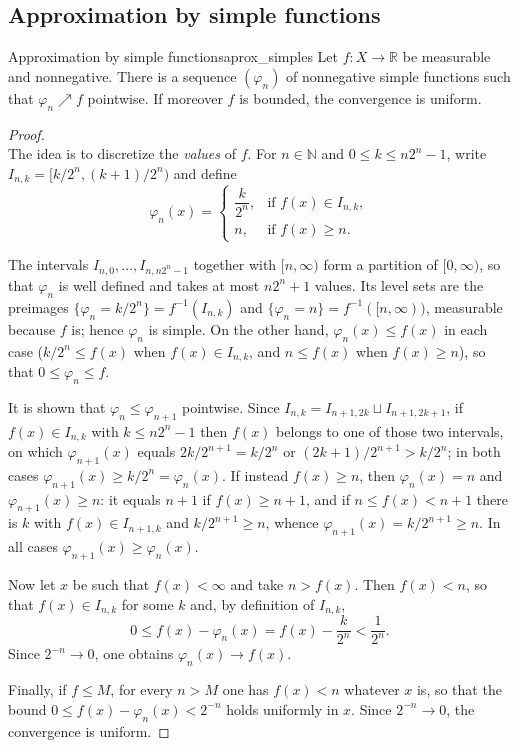 \documentclass[11pt, a4paper]{article}
\begin{document}
\subsection{Approximation by simple functions}

\begin{teorema}{Approximation by simple functions}{aprox_simples}
Let $f: X \to \mathbb{R}$ be measurable and nonnegative. There is a sequence $(\varphi_n)$ of nonnegative
simple functions such that $\varphi_n \nearrow f$ pointwise. If moreover $f$ is bounded, the
convergence is uniform.
\end{teorema}

\begin{proof}\leavevmode\\
The idea is to discretize the \emph{values} of $f$. For $n \in \mathbb{N}$ and $0 \le k \le n 2^n - 1$,
write $I_{n,k} = [k/2^n, (k+1)/2^n)$ and define
$$ \varphi_n(x) = \begin{cases}
\dfrac{k}{2^n}, & \text{if } f(x) \in I_{n,k}, \\
n, & \text{if } f(x) \ge n.
\end{cases} $$

The intervals $I_{n,0}, \dots, I_{n, n2^n - 1}$ together with $[n, \infty)$ form a partition of
$[0, \infty)$, so that $\varphi_n$ is well defined and takes at most $n 2^n + 1$ values.
Its level sets are the preimages $\{\varphi_n = k/2^n\} = f^{-1}(I_{n,k})$ and
$\{\varphi_n = n\} = f^{-1}([n, \infty))$, measurable because $f$ is; hence $\varphi_n$ is simple. On
the other hand, $\varphi_n(x) \le f(x)$ in each case ($k/2^n \le f(x)$ when $f(x) \in I_{n,k}$, and
$n \le f(x)$ when $f(x) \ge n$), so that $0 \le \varphi_n \le f$.

It is shown that $\varphi_n \le \varphi_{n+1}$ pointwise. Since $I_{n,k} = I_{n+1, 2k} \sqcup
I_{n+1, 2k+1}$, if $f(x) \in I_{n,k}$ with $k \le n 2^n - 1$ then $f(x)$ belongs to one of those
two intervals, on which $\varphi_{n+1}(x)$ equals $2k/2^{n+1} = k/2^n$ or
$(2k+1)/2^{n+1} > k/2^n$; in both cases $\varphi_{n+1}(x) \ge k/2^n = \varphi_n(x)$. If instead
$f(x) \ge n$, then $\varphi_n(x) = n$ and $\varphi_{n+1}(x) \ge n$: it equals $n+1$ if $f(x) \ge n+1$,
and if $n \le f(x) < n+1$ there is $k$ with $f(x) \in I_{n+1,k}$ and $k/2^{n+1} \ge n$, whence
$\varphi_{n+1}(x) = k/2^{n+1} \ge n$. In all cases $\varphi_{n+1}(x) \ge \varphi_n(x)$.

Now let $x$ be such that $f(x) < \infty$ and take $n > f(x)$. Then $f(x) < n$, so that
$f(x) \in I_{n,k}$ for some $k$ and, by definition of $I_{n,k}$,
$$ 0 \le f(x) - \varphi_n(x) = f(x) - \frac{k}{2^n} < \frac{1}{2^n}. $$
Since $2^{-n} \to 0$, one obtains $\varphi_n(x) \to f(x)$.

Finally, if $f \le M$, for every $n > M$ one has $f(x) < n$ whatever $x$ is, so that the
bound $0 \le f(x) - \varphi_n(x) < 2^{-n}$ holds uniformly in $x$. Since $2^{-n} \to 0$, the
convergence is uniform.
\end{proof}
\end{document}
